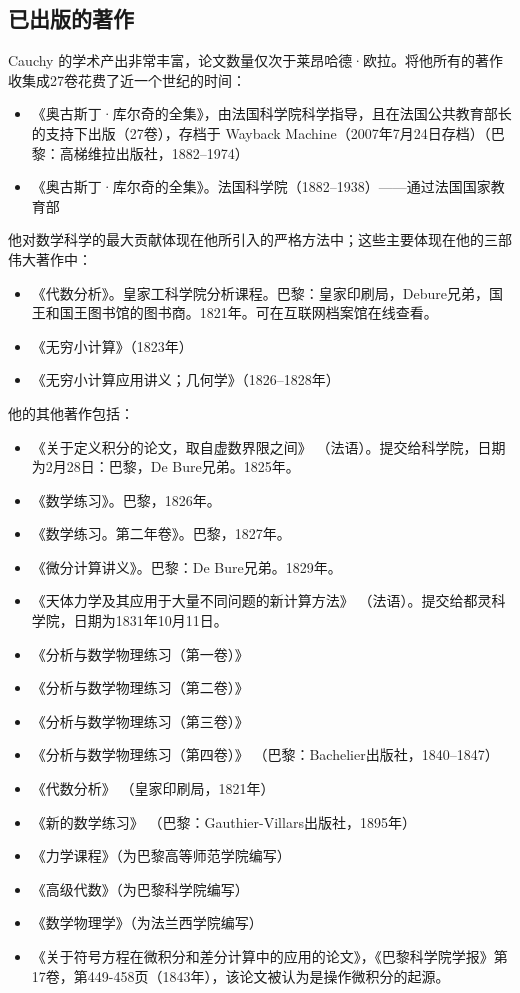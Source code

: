 \subsection{已出版的著作}
Cauchy 的学术产出非常丰富，论文数量仅次于莱昂哈德·欧拉。将他所有的著作收集成27卷花费了近一个世纪的时间：
\begin{itemize}
\item 《奥古斯丁·库尔奇的全集》，由法国科学院科学指导，且在法国公共教育部长的支持下出版（27卷），存档于 Wayback Machine（2007年7月24日存档）（巴黎：高梯维拉出版社，1882–1974）
\item 《奥古斯丁·库尔奇的全集》。法国科学院（1882–1938）——通过法国国家教育部
\end{itemize}
他对数学科学的最大贡献体现在他所引入的严格方法中；这些主要体现在他的三部伟大著作中：
\begin{itemize}
\item 《代数分析》。皇家工科学院分析课程。巴黎：皇家印刷局，Debure兄弟，国王和国王图书馆的图书商。1821年。可在互联网档案馆在线查看。
\item 《无穷小计算》（1823年）
\item 《无穷小计算应用讲义；几何学》（1826–1828年）
\end{itemize}
他的其他著作包括：
\begin{itemize}
\item 《关于定义积分的论文，取自虚数界限之间》 （法语）。提交给科学院，日期为2月28日：巴黎，De Bure兄弟。1825年。
\item 《数学练习》。巴黎，1826年。
\item 《数学练习。第二年卷》。巴黎，1827年。
\item 《微分计算讲义》。巴黎：De Bure兄弟。1829年。
\item 《天体力学及其应用于大量不同问题的新计算方法》 （法语）。提交给都灵科学院，日期为1831年10月11日。
\item 《分析与数学物理练习（第一卷）》  
\item 《分析与数学物理练习（第二卷）》  
\item 《分析与数学物理练习（第三卷）》  
\item 《分析与数学物理练习（第四卷）》 （巴黎：Bachelier出版社，1840–1847）  
\item 《代数分析》 （皇家印刷局，1821年）  
\item 《新的数学练习》 （巴黎：Gauthier-Villars出版社，1895年）  
\item 《力学课程》（为巴黎高等师范学院编写）  
\item 《高级代数》（为巴黎科学院编写）  
\item 《数学物理学》（为法兰西学院编写）  
\item 《关于符号方程在微积分和差分计算中的应用的论文》，《巴黎科学院学报》第17卷，第449-458页（1843年），该论文被认为是操作微积分的起源。
\end{itemize}
